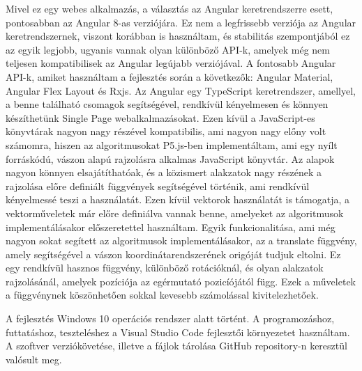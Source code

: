 Mivel ez egy webes alkalmazás, a választás az Angular keretrendszerre esett, pontosabban az Angular 8-as verziójára. Ez nem a legfrissebb verziója az Angular keretrendszernek, viszont korábban is használtam, és stabilitás szempontjából ez az egyik legjobb, ugyanis vannak olyan különböző API-k, amelyek még nem teljesen kompatibilisek az Angular legújabb verziójával. A fontosabb Angular API-k, amiket használtam a fejlesztés során a következők: Angular Material, Angular Flex Layout és Rxjs. Az Angular egy TypeScript keretrendszer, amellyel, a benne található csomagok segítségével, rendkívül kényelmesen és könnyen készíthetünk Single Page webalkalmazásokat. Ezen kívül a JavaScript-es könyvtárak nagyon nagy részével kompatibilis, ami nagyon nagy előny volt számomra, hiszen az algoritmusokat P5.js-ben implementáltam, ami egy nyílt forráskódú, vászon alapú rajzolásra alkalmas JavaScript könyvtár. Az alapok nagyon könnyen elsajátíthatóak, és a közismert alakzatok nagy részének a rajzolása előre definiált függvények segítségével történik, ami rendkívül kényelmessé teszi a használatát. Ezen kívül vektorok használatát is támogatja, a vektorműveletek már előre definiálva vannak benne, amelyeket az algoritmusok implementálásakor előszeretettel használtam. Egyik funkcionalitása, ami még nagyon sokat segített az algoritmusok implementálásakor, az a translate függvény, amely segítségével a vászon koordinátarendszerének origóját tudjuk eltolni. Ez egy rendkívül hasznos függvény, különböző rotációknál, és olyan alakzatok rajzolásánál, amelyek pozíciója az egérmutató pozicíójától függ. Ezek a műveletek a függvénynek köszönhetően sokkal kevesebb számolással kivitelezhetőek.
\par
A fejlesztés Windows 10 operációs rendszer alatt történt. A programozáshoz, futtatáshoz, teszteléshez a Visual Studio Code fejlesztői környezetet használtam. A szoftver verziókövetése, illetve a fájlok tárolása GitHub repository-n keresztül valósult meg.
